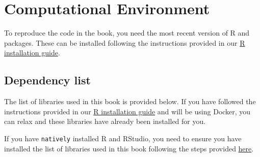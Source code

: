 \documentclass[
  letterpaper,
  DIV=11,
  numbers=noendperiod]{scrreprt}
\begin{document}
\hypertarget{computational-environment}{%
\section{Computational Environment}\label{computational-environment}}

To reproduce the code in the book, you need the most recent version of R
and packages. These can be installed following the instructions provided
in our \href{https://gdsl-ul.github.io/r_install/}{R installation
guide}.

\hypertarget{dependency-list}{%
\subsection{Dependency list}\label{dependency-list}}

The list of libraries used in this book is provided below. If you have
followed the instructions provided in our
\href{https://gdsl-ul.github.io/r_install/}{R installation guide} and
will be using Docker, you can relax and these libraries have already
been installed for you.

If you have \texttt{natively} installed R and RStudio, you need to
ensure you have installed the list of libraries used in this book
following the steps provided
\href{https://gdsl-ul.github.io/r_install/otherWin.html\#install-packages}{here}.
\end{document}
